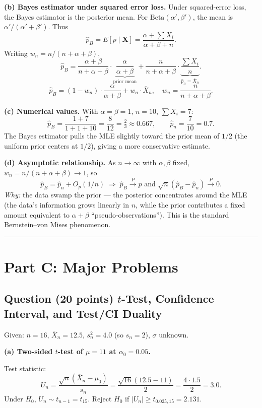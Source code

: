 \documentclass[11pt]{article}
\newcounter{qnum}
\newcommand{\question}[2]{\stepcounter{qnum}\subsection*{Question \theqnum \quad (#1 points) \hfill #2}}
\begin{document}
\textbf{(b) Bayes estimator under squared error loss.} Under squared-error loss, the Bayes estimator is the posterior mean. For $\mathrm{Beta}(\alpha',\beta')$, the mean is $\alpha'/(\alpha'+\beta')$. Thus
\[ \hat p_B = E[p \mid \mathbf{X}] = \frac{\alpha + \sum X_i}{\alpha + \beta + n}. \]
Writing $w_n = n/(n+\alpha+\beta)$,
\[ \hat p_B = \frac{\alpha+\beta}{n+\alpha+\beta}\cdot\underbrace{\frac{\alpha}{\alpha+\beta}}_{\text{prior mean}} + \frac{n}{n+\alpha+\beta}\cdot\underbrace{\frac{\sum X_i}{n}}_{\hat p_n = \overline{X}_n}. \]
\[ \boxed{\hat p_B = (1 - w_n)\cdot \frac{\alpha}{\alpha+\beta} + w_n \cdot \overline{X}_n, \quad w_n = \frac{n}{n+\alpha+\beta}.} \]

\textbf{(c) Numerical values.} With $\alpha = \beta = 1$, $n = 10$, $\sum X_i = 7$:
\[ \hat p_B = \frac{1 + 7}{1 + 1 + 10} = \frac{8}{12} = \boxed{\tfrac{2}{3} \approx 0.667}, \qquad \hat p_n = \frac{7}{10} = \boxed{0.7}. \]
The Bayes estimator pulls the MLE slightly toward the prior mean of $1/2$ (the uniform prior centers at $1/2$), giving a more conservative estimate.

\textbf{(d) Asymptotic relationship.} As $n \to \infty$ with $\alpha,\beta$ fixed, $w_n = n/(n+\alpha+\beta) \to 1$, so
\[ \boxed{\hat p_B = \hat p_n + O_p(1/n) \;\Longrightarrow\; \hat p_B \xrightarrow{P} p \text{ and } \sqrt{n}(\hat p_B - \hat p_n) \xrightarrow{P} 0.} \]
\emph{Why:} the data swamp the prior --- the posterior concentrates around the MLE (the data's information grows linearly in $n$, while the prior contributes a fixed amount equivalent to $\alpha+\beta$ ``pseudo-observations''). This is the standard Bernstein--von Mises phenomenon.

\bigskip
\hrule
\bigskip

\section*{Part C: Major Problems}

\question{20}{$t$-Test, Confidence Interval, and Test/CI Duality}

Given: $n = 16$, $\overline{X}_n = 12.5$, $s_n^2 = 4.0$ (so $s_n = 2$), $\sigma$ unknown.

\textbf{(a) Two-sided $t$-test of $\mu = 11$ at $\alpha_0 = 0.05$.}

Test statistic:
\[ U_n = \frac{\sqrt{n}(\overline{X}_n - \mu_0)}{s_n} = \frac{\sqrt{16}(12.5 - 11)}{2} = \frac{4 \cdot 1.5}{2} = \boxed{3.0}. \]
Under $H_0$, $U_n \sim t_{n-1} = t_{15}$. Reject $H_0$ if $|U_n| \ge t_{0.025,15} = 2.131$.
\end{document}
